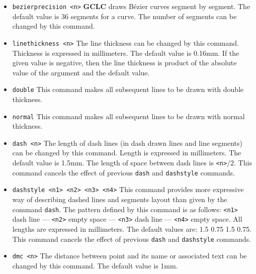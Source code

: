 \documentclass[a4paper]{book}
\newcommand{\gclc}{{\bfseries GCLC}\xspace}
\begin{document}
\begin{itemize}
\item \verb|bezierprecision <n>|
        \gclc draws B\'ezier curves segment by segment. The default value
        is 36 segments for a curve. The number of segments can be changed
        by this command.


\item \verb|linethickness <n>|
        The line thickness can be changed by this command. Thickness is
        expressed in millimeters. The default value is 0.16mm.
        If the given value is negative, then the line thickness is
        product of the absolute value of the argument and the default value.

\item \verb|double|
        This command makes all subsequent lines to be drawn with double thickness.

\item \verb|normal|
        This command makes all subsequent lines to be drawn with normal thickness.

\item \verb|dash <n>|
        The length of dash lines (in dash drawn lines and line segments)
        can be changed by this command. Length is expressed in millimeters.
        The default value is 1.5mm. The length of space between dash
        lines is \verb|<n>|$/2$. This command cancels the effect of
        previous \verb|dash| and \verb|dashstyle| commands.

\item \verb|dashstyle <n1> <n2> <n3> <n4>|
        This command provides more expressive way of describing dashed
        lines and segments layout than given by the command \verb|dash|.
        The pattern defined by this command is as follows:
        \verb|<n1>| dash line --- \verb|<n2>| empty space ---
        \verb|<n3>| dash line --- \verb|<n4>| empty space.
        All lengths are expressed in millimeters.
        The default values are: 1.5 0.75 1.5 0.75.
        This command cancels the effect of
        previous \verb|dash| and \verb|dashstyle| commands.

\item \verb|dmc <n>|
        The distance between point and its name or associated text can
        be changed by this command. The default value is 1mm.


\end{itemize}
\end{document}
